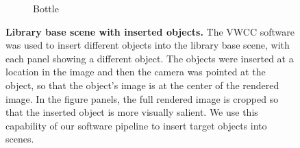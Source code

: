 \documentclass{jov}
\begin{document}
\begin{figure}[h]
\begin{subfigure}[b]{0.14 \textwidth}
        \caption{Bottle}
        \label{fig:libraryWithChampagneBottle}
    \end{subfigure}
\caption{{\bf Library base scene with inserted objects.} The VWCC software was used to insert different objects into the library base scene, with each panel showing a different object. The objects were inserted at a location in the image and then the camera was pointed at the object, so that the object's image is at the center of the rendered image.  In the figure panels, the full rendered image is cropped so that the inserted object is more visually salient. We use this capability of our software pipeline to insert target objects into scenes.}\label{fig:libraryWithTarget}
\end{figure}

\begin{figure}
\centering
	\begin{subfigure}[b]{0.18 \textwidth}
    \centering

\end{subfigure}
\end{figure}
\end{document}
